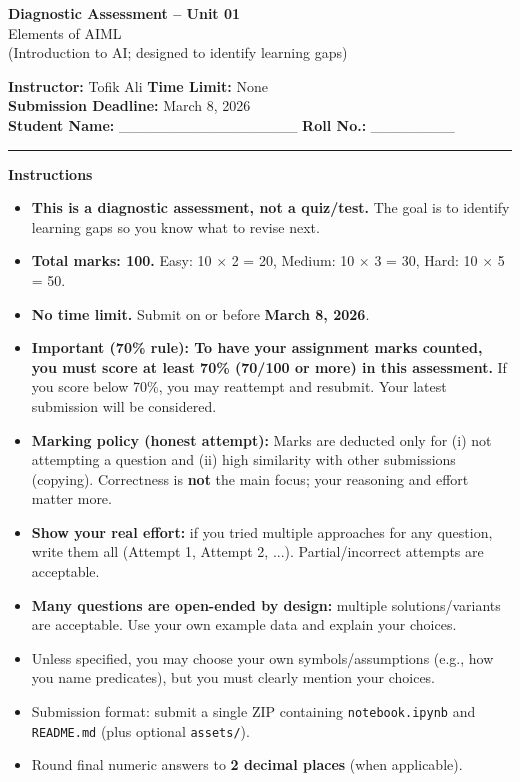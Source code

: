 \documentclass[11pt,a4paper]{article}
\newcommand{\SubmissionDeadline}{March 8, 2026}
\begin{document}
\begin{center}
  {\LARGE \textbf{Diagnostic Assessment -- Unit 01}}\\[0.25em]
  {\large Elements of AIML}\\[0.25em]
  \normalsize (Introduction to AI; designed to identify learning gaps)
\end{center}

\noindent
\textbf{Instructor:} Tofik Ali \hfill \textbf{Time Limit:} None\\
\textbf{Submission Deadline:} \SubmissionDeadline\\
\textbf{Student Name:} \_\_\_\_\_\_\_\_\_\_\_\_\_\_\_\_\_ \hfill \textbf{Roll No.:} \_\_\_\_\_\_\_\_\\

\vspace{0.6em}
\hrule
\vspace{0.8em}

\textbf{Instructions}
\begin{itemize}[leftmargin=*]
  \item \textbf{This is a diagnostic assessment, not a quiz/test.} The goal is to identify learning gaps so you know what to revise next.
  \item \textbf{Total marks: 100.} Easy: 10 $\times$ 2 = 20, Medium: 10 $\times$ 3 = 30, Hard: 10 $\times$ 5 = 50.
  \item \textbf{No time limit.} Submit on or before \textbf{\SubmissionDeadline}.
  \item \textbf{Important (70\% rule): To have your assignment marks counted, you must score at least 70\% (70/100 or more) in this assessment.}
    If you score below 70\%, you may reattempt and resubmit. Your latest submission will be considered.
  \item \textbf{Marking policy (honest attempt):} Marks are deducted only for (i) not attempting a question and (ii) high similarity with other submissions (copying).
    Correctness is \textbf{not} the main focus; your reasoning and effort matter more.
  \item \textbf{Show your real effort:} if you tried multiple approaches for any question, write them all (Attempt 1, Attempt 2, ...). Partial/incorrect attempts are acceptable.
  \item \textbf{Many questions are open-ended by design:} multiple solutions/variants are acceptable. Use your own example data and explain your choices.
  \item Unless specified, you may choose your own symbols/assumptions (e.g., how you name predicates), but you must clearly mention your choices.
  \item Submission format: submit a single ZIP containing \texttt{notebook.ipynb} and \texttt{README.md} (plus optional \texttt{assets/}).
  \item Round final numeric answers to \textbf{2 decimal places} (when applicable).
\end{itemize}
\end{document}
